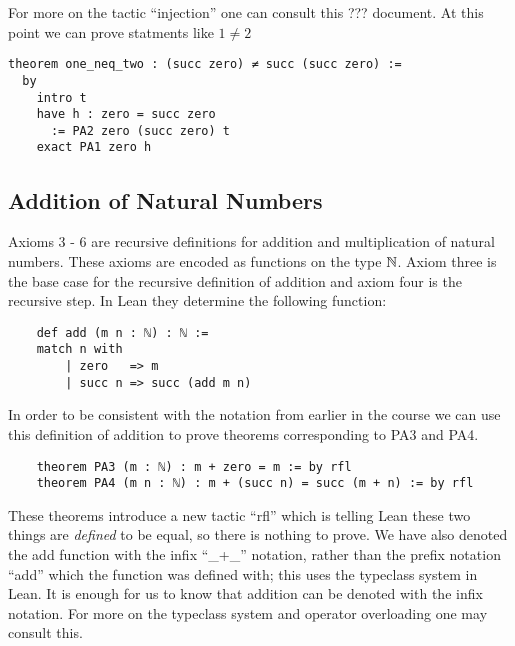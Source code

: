 \documentclass{book}
\begin{document}
For more on the tactic ``injection'' one can consult this ??? document. At this point we can prove statments like $1 \neq 2$ 

\begin{center}
    \begin{lstlisting}
theorem one_neq_two : (succ zero) ≠ succ (succ zero) :=
  by
    intro t
    have h : zero = succ zero
      := PA2 zero (succ zero) t
    exact PA1 zero h
    \end{lstlisting}
\end{center}

\subsection*{Addition of Natural Numbers}

Axioms 3 - 6 are recursive definitions for addition and multiplication of natural numbers. These axioms are encoded as functions on the type $\mathbb{N}$. Axiom three is the base case for the recursive definition of addition and axiom four is the recursive step. In Lean they determine the following function: 

\begin{center}
    \begin{lstlisting}
    def add (m n : ℕ) : ℕ :=
    match n with
        | zero   => m
        | succ n => succ (add m n)
    \end{lstlisting}
\end{center}

In order to be consistent with the notation from earlier in the course we can use this definition of addition to prove theorems corresponding to PA3 and PA4. 

\begin{center}
    \begin{lstlisting}
    theorem PA3 (m : ℕ) : m + zero = m := by rfl
    theorem PA4 (m n : ℕ) : m + (succ n) = succ (m + n) := by rfl
    \end{lstlisting}
\end{center}

These theorems introduce a new tactic ``rfl'' which is telling Lean these two things are \emph{defined} to be equal, so there is nothing to prove. We have also denoted the add function with the infix ``\_+\_'' notation, rather than the prefix notation ``add'' which the function was defined with; this uses the typeclass system in Lean. It is enough for us to know that addition can be denoted with the infix notation. For more on the typeclass system and operator overloading one may consult this.
\end{document}
